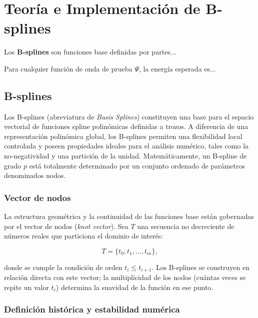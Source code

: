 \chapter{Teoría e Implementación de B-splines}
\label{ap:splines}

\begin{definition}
    Los \textbf{B-splines} son funciones base definidas por partes...
\end{definition}

\begin{theorem}
    Para cualquier función de onda de prueba $\Psi$, la energía esperada es...
\end{theorem}


\section{B-splines}

Los B-splines (abreviatura de \textit{Basis Splines}) constituyen una base para el espacio vectorial de funciones spline polinómicas definidas a trozos. A diferencia de una representación polinómica global, los B-splines permiten una flexibilidad local controlada y poseen propiedades ideales para el análisis numérico, tales como la no-negatividad y una partición de la unidad. Matemáticamente, un B-spline de grado \( p \) está totalmente determinado por un conjunto ordenado de parámetros denominados nodos.

\subsection{Vector de nodos}

La estructura geométrica y la continuidad de las funciones base están gobernadas por el vector de nodos (\textit{knot vector}). Sea \( T \) una secuencia no decreciente de números reales que particiona el dominio de interés:

\begin{equation}
\label{eq:knot-vector}
  T = \{ t_0, t_1, \dots, t_m \},
\end{equation}

donde se cumple la condición de orden \( t_i \leq t_{i+1} \). Los B-splines se construyen en relación directa con este vector; la multiplicidad de los nodos (cuántas veces se repite un valor \( t_i \)) determina la suavidad de la función en ese punto.

\subsection{Definición histórica y estabilidad numérica}

